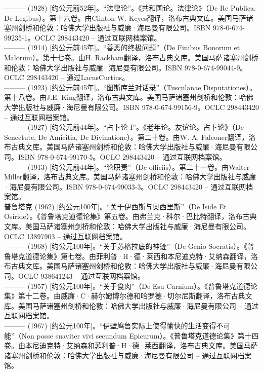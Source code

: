 ——— (1928) [约公元前52年]。“法律论”。《共和国论。法律论》（De Re Publica. De Legibus）。第十六卷。由Clinton W. Keyes翻译，洛布古典文库。美国马萨诸塞州剑桥和伦敦：哈佛大学出版社与威廉·海尼曼有限公司。ISBN 978-0-674-99235-1。OCLC 298443420 – 通过互联网档案馆。\\
——— (1914) [约公元前45年]。“善恶的终极问题”（De Finibus Bonorum et Malorum）。第十七卷。由H. Rackham翻译，洛布古典文库。美国马萨诸塞州剑桥和伦敦：哈佛大学出版社与威廉·海尼曼有限公司。ISBN 978-0-674-99044-9。OCLC 298443420 – 通过LacusCurtius。\\
——— (1923) [约公元前45年]。“图斯库兰对话录”（Tusculanae Disputationes）。第十八卷。由J.E. King翻译，洛布古典文库。美国马萨诸塞州剑桥和伦敦：哈佛大学出版社与威廉·海尼曼有限公司。ISBN 978-0-674-99156-9。OCLC 298443420 – 通过互联网档案馆。\\
——— (1927) [约公元前44年]。“占卜论 I”。《老年论。友谊论。占卜论》（De Senectute, De Amicitia, De Divinatione）。第二十卷。由W. A. Falconer翻译，洛布古典文库。美国马萨诸塞州剑桥和伦敦：哈佛大学出版社与威廉·海尼曼有限公司。ISBN 978-0-674-99170-5。OCLC 298443420 – 通过互联网档案馆。\\
——— (1913) [约公元前44年]。“论职责”（De officiis）。第二十一卷。由Walter Miller翻译，洛布古典文库。美国马萨诸塞州剑桥和伦敦：哈佛大学出版社与威廉·海尼曼有限公司。ISBN 978-0-674-99033-3。OCLC 298443420 – 通过互联网档案馆。\\
普鲁塔克 (1962) [约公元100年]。“关于伊西斯与奥西里斯”（De Iside Et Osiride）。《普鲁塔克道德论集》第五卷。由弗兰克·科尔·巴比特翻译，洛布古典文库。美国马萨诸塞州剑桥和伦敦：哈佛大学出版社与威廉·海尼曼有限公司。OCLC 13897903 – 通过互联网档案馆。\\
——— (1968) [约公元100年]。“关于苏格拉底的神迹”（De Genio Socratis）。《普鲁塔克道德论集》第七卷。由菲利普·H·德·莱西和本尼迪克特·艾纳森翻译，洛布古典文库。美国马萨诸塞州剑桥和伦敦：哈佛大学出版社与威廉·海尼曼有限公司。OCLC 938641243 – 通过互联网档案馆。\\
——— (1957) [约公元100年]。“关于食肉”（De Esu Carnium）。《普鲁塔克道德论集》第十二卷。由威廉·C·赫尔姆博尔德和哈罗德·切尔尼斯翻译，洛布古典文库。美国马萨诸塞州剑桥和伦敦：哈佛大学出版社与威廉·海尼曼有限公司 – 通过互联网档案馆。\\
——— (1967) [约公元100年]。“伊壁鸠鲁实际上使得愉快的生活变得不可能”（Non posse suaviter vivi secundum Epicurum）。《普鲁塔克道德论集》第十四卷。由本尼迪克特·艾纳森和菲利普·H·德·莱西翻译，洛布古典文库。美国马萨诸塞州剑桥和伦敦：哈佛大学出版社与威廉·海尼曼有限公司 – 通过互联网档案馆。\\
